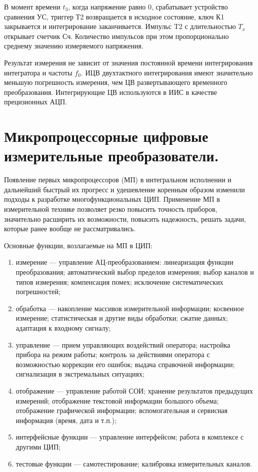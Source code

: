 \documentclass[unicode, 12pt, a4paper, oneside]{article}
\begin{document}
В момент времени $t_3$, когда напряжение равно 0, срабатывает устройство сравнения УС, триггер Т2 возвращается в исходное состояние, ключ К1 закрывается и интегрирование заканчивается. Импульс T2 с длительностью $T_x$ открывает счетчик Сч. Количество импульсов при этом пропорционально среднему значению измеряемого напряжения.

Результат измерения не зависит от значения постоянной времени интегрирования интегратора и частоты $f_0$.
ИЦВ двухтактного интегрирования имеют значительно меньшую погрешность измерения, чем ЦВ развертывающего временного преобразования. Интегрирующие ЦВ используются в ИИС в качестве прецизионных АЦП.

\section{Микропроцессорные цифровые измерительные преобразователи.}

Появление первых микропроцессоров (МП) в интегральном исполнении и дальнейший быстрый их прогресс и удешевление коренным образом изменили подходы к разработке многофункциональных ЦИП. Применение МП в измерительной технике позволяет резко повысить точность приборов, значительно расширить их возможности, повысить надежность, решать задачи, которые ранее вообще не рассматривались.

Основные функции, возлагаемые на МП в ЦИП:
\begin{enumerate}
\item измерение — управление АЦ-преобразованием: линеаризация функции преобразования; автоматический выбор пределов измерения; выбор каналов и типов измерения; компенсация помех; исключение систематических погрешностей;
\item обработка — накопление массивов измерительной информации; косвенное измерение; статистическая и другие виды обработки; сжатие данных; адаптация к входному сигналу;
\item управление — прием управляющих воздействий оператора; настройка прибора на режим работы; контроль за действиями оператора с возможностью коррекции его ошибок; выдача справочной информации; сигнализация в экстремальных ситуациях;
\item отображение — управление работой СОИ; хранение результатов предыдущих измерений; отображение текстовой информации большого объема; отображение графической информации; вспомогательная и сервисная информация (время, дата и т.п.);
\item интерфейсные функции — управление интерфейсом; работа в комплексе с другими ЦИП;
\item тестовые функции — самотестирование; калибровка измерительных каналов.
\end{enumerate}
\end{document}

